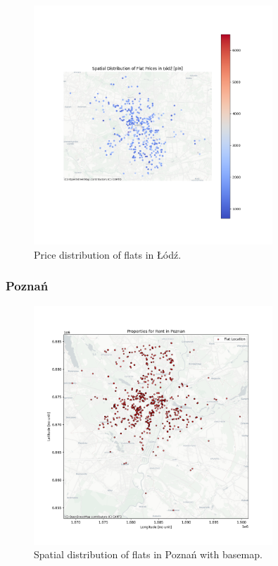     \begin{figure}[H]
        \centering
        \includegraphics[width=0.8\textwidth]{figures/lodz_price_distribution.png}
        \caption{Price distribution of flats in Łódź.}
        \label{fig:lodz_price_distribution}
    \end{figure}

    \subsubsection{Poznań}
    \begin{figure}[H]
        \centering
        \includegraphics[width=0.8\textwidth]{figures/poznan_flats_map_with_basemap.png}
        \caption{Spatial distribution of flats in Poznań with basemap.}
        \label{fig:poznan_basemap}
    \end{figure}

